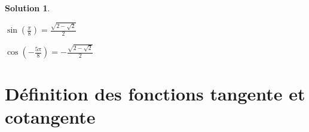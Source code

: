 \documentclass[a4paper,fontsize=13pt]{scrreprt}
\theoremstyle{plain}
\theoremstyle{definition}
\newtheorem*{solu}{Solution}
\begin{document}
\begin{solu}
~\\
\begin{enumerate}
\begin{multicols}{2}
\item $\sin(\frac{\pi}{8})=\frac{\sqrt{2-\sqrt{2}}}{2}$
\item $\cos(-\frac{5\pi}{8})=-\frac{\sqrt{2-\sqrt{2}}}{2}$
\end{multicols}
\end{enumerate}
\end{solu}

\newpage

\section{Définition des fonctions tangente et cotangente}
\end{document}

